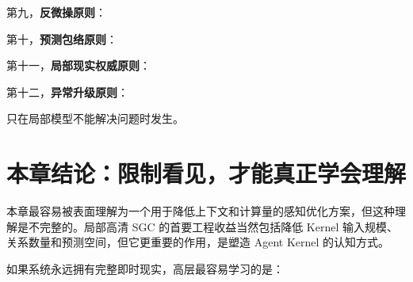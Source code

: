 \begin{statementbox}
\centering
{}
\end{statementbox}

第九，\textbf{反微操原则}：

\begin{statementbox}
\centering
{}
\end{statementbox}

第十，\textbf{预测包络原则}：

\begin{statementbox}
\centering
{}
\end{statementbox}

第十一，\textbf{局部现实权威原则}：

\begin{statementbox}
\centering
{}
\end{statementbox}

第十二，\textbf{异常升级原则}：

\begin{statementbox}
\centering
{}
\end{statementbox}

只在局部模型不能解决问题时发生。

\section{本章结论：限制看见，才能真正学会理解}

本章最容易被表面理解为一个用于降低上下文和计算量的感知优化方案，但这种理解是不完整的。局部高清 SGC 的首要工程收益当然包括降低 Kernel 输入规模、关系数量和预测空间，但它更重要的作用，是塑造 Agent Kernel 的认知方式。

如果系统永远拥有完整即时现实，高层最容易学习的是：

\begin{statementbox}
\centering
{}
\end{statementbox}

